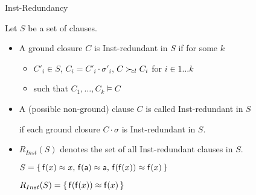 \documentclass[%
handout,
]{beamer}
\begin{document}
\begin{frame}{Inst-Redundancy}

Let $S$ be a set of clauses.

\begin{itemize}
    \item A ground closure $C$ is Inst-redundant in $S$
    if for some $k$
    \begin{itemize}
        \item $C'_i\in S$, $C_i=C'_i\cdot\sigma'_i$, $C\mathrel\succ_{\!cl} C_i$ \hfill for $i\in 1\ldots k$
        \item such that $C_1,\ldots,C_k\models C$
    \end{itemize}
    \vspace{0.7em}
    \item 
    A (possible non-ground) clause $C$ is called Inst-redundant in $S$

if each ground closure $C\cdot\sigma$ is Inst-redundant in $S$.

\vspace{0.7em}
\item
$R_{Inst}(S)$ denotes the set of all Inst-redundant clauses in $S$.

\vspace{0.7em}
\begin{example}
$S =
    \{\,
    \mathsf{f}(x)\approx x,\,
    \mathsf{f}(\mathsf{a})\approx \mathsf{a},\,
    \mathsf{f}(\mathsf{f}(x))\approx\mathsf{f}(x)
    \,\}$

$R_{Inst}(S) = \{\, \mathsf{f}(\mathsf{f}(x))\approx\mathsf{f}(x) \,\}$
\end{example}
\end{itemize}
\end{frame}
\end{document}

